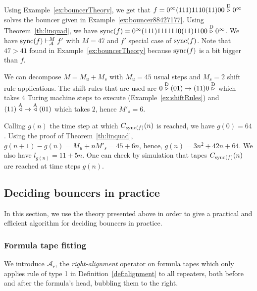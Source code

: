 
\begin{example}\label{ex:linquad}
    Using Example~\ref{ex:bouncerTheory}, we get that $f = 0^\infty (111)1110(11)00\stackrel{\text{D}}\triangleright0^\infty$ solves the bouncer given in Example~\ref{ex:bouncer88427177}. Using Theorem~\ref{th:linquad}, we have $\operatorname{sync}(f)= 0^\infty (111)1111110(11)11 00\stackrel{\text{D}}\triangleright0^\infty$.
    We have $\operatorname{sync}(f) \vdash_\mathcal{A}^{M} f'$ with $M = 47$ and $f'$ special case of $\operatorname{sync}(f)$. Note that $47 > 41$ found in Example~\ref{ex:bouncerTheory} because $\operatorname{sync}(f)$ is a bit bigger than $f$.

    We can decompose $M = M_u + M_s$ with $M_u = 45$ usual steps and $M_s = 2$ shift rule applications. The shift rules that are used are $0 \stackrel{\text{D}}\triangleright(01) \to (11)0\stackrel{\text{D}}\triangleright$ which takes $4$ Turing machine steps to execute (Example~\ref{ex:shiftRules}) and $(11) \stackrel{\text{A}}\triangleleft\; \to \;  \stackrel{\text{A}}\triangleleft (01)$ which takes $2$, hence $M'_s = 6$.

    Calling $g(n)$ the time step at which $C_{\operatorname{sync}(f)}(n)$ is reached, we have $g(0)= 64$. Using the proof of Theorem~\ref{th:linquad}, $g(n+1)-g(n) = M_u + n M'_s = 45 + 6n$, hence, $g(n) = 3n^2 + 42n + 64$. We also have $l_{g(n)} = 11 + 5n$. One can check by simulation that tapes $C_{\operatorname{sync}(f)}(n)$ are reached at time steps $g(n)$.


\end{example}
\newpage
\subsection{Deciding bouncers in practice}\label{sec:bouncers-algo}

In this section, we use the theory presented above in order to give a practical and efficient algorithm for deciding bouncers in practice.

\subsubsection{Formula tape fitting}


We introduce $\mathcal{A}_r$, the \textit{right-alignment} operator on formula tapes which only applies rule of type 1 in Definition~\ref{def:alignment} to all repeaters, both before and after the formula's head, bubbling them to the right.

